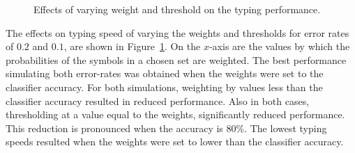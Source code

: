 \documentclass[12pt,titlepage]{article}
\begin{document}
\begin{figure}[t]
\centering
{}
\caption{Effects of varying weight and threshold on the typing performance.}
\label{fig:WeightComp}
\end{figure}

The effects on typing speed of varying the weights and thresholds for error rates of $0.2$ and $0.1$, 
are shown in Figure~\ref{fig:WeightComp}.  On the $x$-axis are the values by which the probabilities of the symbols
in a chosen set are weighted.  The best performance simulating both error-rates was obtained 
when the weights were set to the classifier accuracy.  For both simulations, weighting by values 
less than the classifier accuracy resulted in reduced performance.   Also in both cases, 
thresholding at a value equal to the weights, significantly reduced performance.  This reduction 
is pronounced when the accuracy is 80\%.   The lowest typing speeds resulted when the weights 
were set to lower than the classifier accuracy.
\end{document}

